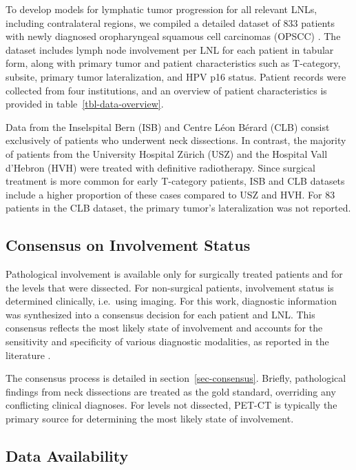 \documentclass[
  sn-mathphys-num,
]{sn-jnl}
\begin{document}
To develop models for lymphatic tumor progression for all relevant LNLs,
including contralateral regions, we compiled a detailed dataset of 833
patients with newly diagnosed oropharyngeal squamous cell carcinomas
(OPSCC) \citep{ludwig_dataset_2022, ludwig_multicentric_2024}. The
dataset includes lymph node involvement per LNL for each patient in
tabular form, along with primary tumor and patient characteristics such
as T-category, subsite, primary tumor lateralization, and HPV p16
status. Patient records were collected from four institutions, and an
overview of patient characteristics is provided in
table~\ref{tbl-data-overview}.

Data from the Inselspital Bern (ISB) and Centre Léon Bérard (CLB) consist
exclusively of patients who underwent neck dissections. In contrast, the
majority of patients from the University Hospital Zürich (USZ) and the
Hospital Vall d'Hebron (HVH) were treated with definitive radiotherapy.
Since surgical treatment is more common for early T-category patients,
ISB and CLB datasets include a higher proportion of these cases compared
to USZ and HVH. For 83 patients in the CLB dataset, the primary tumor's
lateralization was not reported.

\subsection{Consensus on Involvement Status}\label{sec-data-consensus}

Pathological involvement is available only for surgically treated
patients and for the levels that were dissected. For non-surgical
patients, involvement status is determined clinically, i.e.~using
imaging. For this work, diagnostic information was synthesized into a
consensus decision for each patient and LNL. This consensus reflects the
most likely state of involvement and accounts for the sensitivity and
specificity of various diagnostic modalities, as reported in the
literature
\citep{debondt_detection_2007, kyzas_18ffluorodeoxyglucose_2008}.

The consensus process is detailed in section~\ref{sec-consensus}.
Briefly, pathological findings from neck dissections are treated as the
gold standard, overriding any conflicting clinical diagnoses. For levels
not dissected, PET-CT is typically the primary source for determining
the most likely state of involvement.

\subsection{Data Availability}\label{data-availability}
\end{document}

